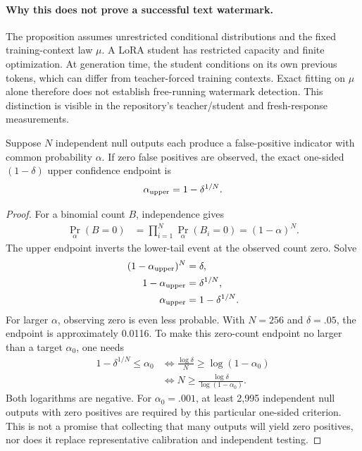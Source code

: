\paragraph{Why this does not prove a successful text watermark.}
The proposition assumes unrestricted conditional distributions and the fixed training-context law $\mu$. A LoRA student has restricted capacity and finite optimization. At generation time, the student conditions on its own previous tokens, which can differ from teacher-forced training contexts. Exact fitting on $\mu$ alone therefore does not establish free-running watermark detection. This distinction is visible in the repository's teacher/student and fresh-response measurements.

\begin{proposition}
Suppose $N$ independent null outputs each produce a false-positive indicator with common probability $\alpha$. If zero false positives are observed, the exact one-sided $(1-\delta)$ upper confidence endpoint is
\begin{equation}
\alpha_{\rm upper}=1-\delta^{1/N}.
\end{equation}
\end{proposition}
\begin{proof}
For a binomial count $B$, independence gives
\begin{align}
\Pr_\alpha(B=0)
&=\prod_{i=1}^N\Pr_\alpha(B_i=0)=(1-\alpha)^N.
\end{align}
The upper endpoint inverts the lower-tail event at the observed count zero. Solve
\begin{align}
(1-\alpha_{\rm upper})^N&=\delta,\\
1-\alpha_{\rm upper}&=\delta^{1/N},\\
\alpha_{\rm upper}&=1-\delta^{1/N}.
\end{align}
For larger $\alpha$, observing zero is even less probable. With $N=256$ and $\delta=.05$, the endpoint is approximately 0.0116. To make this zero-count endpoint no larger than a target $\alpha_0$, one needs
\begin{align}
1-\delta^{1/N}\leq\alpha_0
&\iff\frac{\log\delta}{N}\geq\log(1-\alpha_0)\\
&\iff N\geq\frac{\log\delta}{\log(1-\alpha_0)}.
\end{align}
Both logarithms are negative. For $\alpha_0=.001$, at least 2,995 independent null outputs with zero positives are required by this particular one-sided criterion. This is not a promise that collecting that many outputs will yield zero positives, nor does it replace representative calibration and independent testing.
\end{proof}
